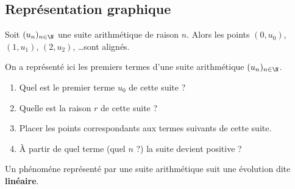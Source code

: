 \documentclass{article}
\begin{document}
\subsection{Représentation graphique}
\begin{proposition}
Soit $(u_n)_{n \in \N}$ une suite arithmétique de raison $n$. Alors les points $(0,u_0)$, $(1,u_1)$, $(2,u_2)$, \dots sont alignés.
\end{proposition}
\begin{example}
\hfill
\begin{center}
\end{center}
On a représenté ici les premiers termes d'une suite arithmétique $(u_n)_{n \in \N}$.
\begin{enumerate}[label=\emph{\alph*)}]
\item Quel est le premier terme $u_0$ de cette suite ? \answersline
\item Quelle est la raison $r$ de cette suite ? \answersline
\item Placer les points correspondants aux termes suivants de cette suite.
\item À partir de quel terme (quel $n$ ?) la suite devient positive ? \answersline
\end{enumerate}
\end{example}
\begin{tcolorbox}
\begin{remark}
Un phénoméne représenté par une suite arithmétique suit une évolution dite \textbf{linéaire}.        
\end{remark}
\end{tcolorbox}
\newpage
\end{document}
